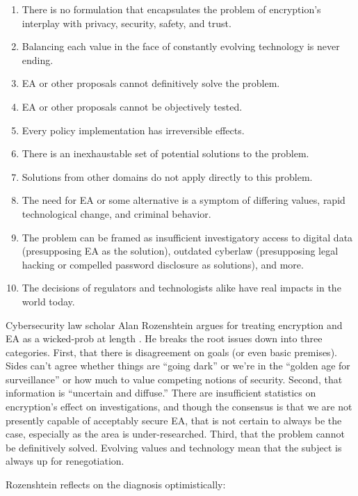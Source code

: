 \begin{enumerate}
  \item There is no formulation that encapsulates the problem of encryption's interplay with privacy, security,
        safety, and trust.
  \item Balancing each value in the face of constantly evolving technology is never ending.
  \item \ac{EA} or other proposals cannot definitively solve the problem.
  \item \ac{EA} or other proposals cannot be objectively tested.
  \item Every policy implementation has irreversible effects.
  \item There is an inexhaustable set of potential solutions to the problem.
  \item Solutions from other domains do not apply directly to this problem.
  \item The need for \ac{EA} or some alternative is a symptom of differing values, rapid technological change, and
        criminal behavior.
  \item The problem can be framed as insufficient investigatory access to digital data (presupposing \ac{EA} as the
        solution), outdated cyberlaw (presupposing legal hacking or compelled password disclosure as solutions), and
        more.
  \item The decisions of regulators and technologists alike have real impacts in the world today.
\end{enumerate}

Cybersecurity law scholar Alan Rozenshtein argues for treating \ac{encryption} and \ac{EA} as a \ac{wicked-prob} at
length \cite{rozenshtein_wicked_2018}. He breaks the root issues down into three categories. First, that there is
disagreement on goals (or even basic premises). Sides can't agree whether things are ``going dark'' or we're in the
``golden age for surveillance'' or how much to value competing notions of security. Second, that information is
``uncertain and diffuse.'' There are insufficient statistics on encryption's effect on investigations, and though the
consensus is that we are not presently capable of acceptably secure \ac{EA}, that is not certain to always be the case,
especially as the area is under-researched. Third, that the problem cannot be definitively solved. Evolving values and
technology mean that the subject is always up for renegotiation.

Rozenshtein reflects on the diagnosis optimistically:

